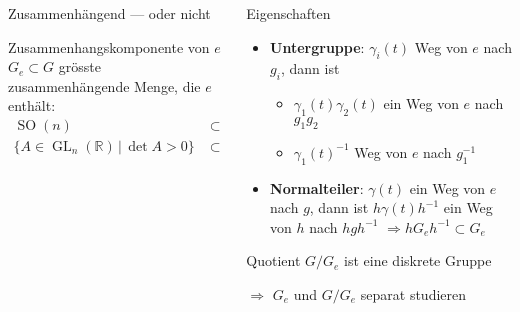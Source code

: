 \begin{frame}[t]
\begin{columns}[t,onlytextwidth]
\begin{column}{0.48\textwidth}
\begin{block}{Zusammenhängend --- oder nicht}
\begin{center}
\begin{tikzpicture}[>=latex,thick]
\end{tikzpicture}
\end{center}
\end{block}
\begin{block}{Zusammenhangskomponente von $e$}
$G_e\subset G$ grösste zusammenhängende Menge, die $e$ enthält:
\begin{align*}
\operatorname{SO}(n)&\subset \operatorname{O}(n)
\\
\{A\in\operatorname{GL}_n(\mathbb{R})\,|\, \det A > 0\}
	&\subset \operatorname{GL}_n(\mathbb{R})
\end{align*}
\end{block}
\end{column}
\begin{column}{0.48\textwidth}
\begin{block}{Eigenschaften}
\begin{itemize}
\item
{\bf Untergruppe}: $\gamma_i(t)$ Weg von $e$ nach $g_i$,
dann ist
\begin{itemize}
\item
$\gamma_1(t)\gamma_2(t)$ ein Weg von $e$ nach $g_1g_2$
\item
$\gamma_1(t)^{-1}$ Weg von $e$ nach $g_1^{-1}$
\end{itemize}
\item
{\bf Normalteiler}: $\gamma(t)$ ein Weg von $e$ nach $g$, dann 
ist $h\gamma(t)h^{-1}$ ein Weg von $h$ nach $hgh^{-1}$
$\Rightarrow hG_eh^{-1}\subset G_e$
\end{itemize}
\end{block}
\begin{block}{Quotient}
$G/G_e$ ist eine diskrete Gruppe
\begin{center}
\end{center}
\vspace{-7pt}
$\Rightarrow$ $G_e$ und $G/G_e$ separat studieren
\end{block}
\end{column}
\end{columns}
\end{frame}
\egroup
